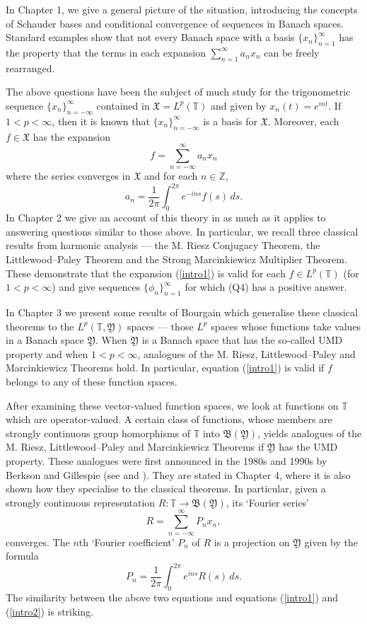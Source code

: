 \documentclass[mmath,12pt]{unswthesis}   %
\newcommand{\T}{\mathbb{T}}
\newcommand{\Z}{\mathbb{Z}}
\newcommand{\B}{\mathfrak{B}}
\newcommand{\X}{\mathfrak{X}}
\newcommand{\Y}{\mathfrak{Y}}
\numberwithin{equation}{section}
\begin{document}
In Chapter 1, we give a general picture of the situation, introducing the
concepts of Schauder bases and conditional convergence of sequences in Banach
spaces. Standard examples show that not every Banach space with a basis
$\{x_n\}_{n=1}^{\infty}$ has the property that the terms in each expansion 
$\sum_{n=1}^{\infty}a_nx_n$ can be freely rearranged.


The above questions have been the subject of much study for the trigonometric
sequence $\{x_n\}_{n=-\infty}^{\infty}$ contained in $\X=L^p(\T)$ and given by
$x_n(t)=e^{int}$. If $1<p<\infty$, then it is known that
$\{x_n\}_{n=-\infty}^{\infty}$ is a basis for $\X$. Moreover, each $f\in\X$ has
the expansion
\begin{equation}\label{intro1}
f=\sum_{n=-\infty}^{\infty}a_nx_n
\end{equation}
where the series converges in $\X$ and for each $n\in\Z$,
\begin{equation}\label{intro2}
a_n=\frac{1}{2\pi}\int_0^{2\pi}e^{-ins}f(s)\,ds.
\end{equation}
In Chapter 2 we give an account of this theory in as much as it applies to
answering questions similar to those above. In particular, we recall three
classical results from harmonic analysis --- the M. Riesz Conjugacy Theorem,
the Littlewood--Paley Theorem and the Strong Marcinkiewicz Multiplier Theorem.
These demonstrate that the expansion (\ref{intro1}) is valid for each 
$f\in L^p(\T)$ (for $1<p<\infty$) and give sequences
$\{\phi_n\}_{n=1}^{\infty}$ for which (Q4) has a positive answer.

In Chapter 3 we present some results of Bourgain
which generalise these classical theorems to the $L^p(\T,\Y)$ spaces
--- those $L^p$ spaces whose functions take values in a Banach space $\Y$. 
When
$\Y$ is a Banach space that has the so-called UMD property and when 
$1<p<\infty$,
analogues of the M. Riesz, Littlewood--Paley and Marcinkiewicz Theorems hold. In
particular, equation (\ref{intro1}) is valid if $f$ belongs to any of these
function spaces.

After examining these vector-valued function spaces, we look at functions on
$\T$ which are operator-valued. A certain class of functions, whose members are
strongly continuous group homorphisms of $\T$ into $\B(\Y)$, yields analogues of
the M. Riesz, Littlewood--Paley and Marcinkiewicz Theorems if
$\Y$ has the UMD property.
These analogues were first announced in the 1980s and 1990s by Berkson
and Gillespie (see \cite{BG Fourier} and \cite{BG Spectral}). They are stated
in Chapter 4, where it is also shown how they
specialise to the classical theorems. In particular, given a strongly continuous
representation $R:\T\rightarrow\B(\Y)$, its `Fourier series'
\[R=\sum_{n=-\infty}^{\infty}P_nx_n,\]
converges. The $n$th `Fourier coefficient' $P_n$ of $R$ is a projection
on $\Y$ given by the formula
\[P_n=\frac{1}{2\pi}\int_0^{2\pi}e^{ins}R(s)\,ds.\]
The similarity between the above two equations and equations (\ref{intro1}) and
(\ref{intro2}) is striking.
\end{document}
